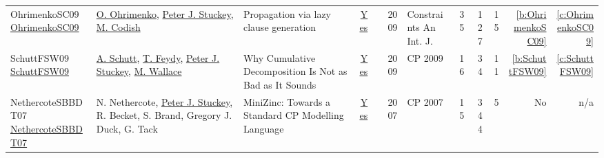 {\begin{longtable}{>{\raggedright\arraybackslash}p{3cm}>{\raggedright\arraybackslash}p{6cm}>{\raggedright\arraybackslash}p{6.5cm}rrrp{2.5cm}rrrrr}
OhrimenkoSC09 \href{http://dx.doi.org/10.1007/s10601-008-9064-x}{OhrimenkoSC09} & \hyperref[auth:a874]{O. Ohrimenko}, \hyperref[auth:a126]{Peter J. Stuckey}, \hyperref[auth:a875]{M. Codish} & Propagation via lazy clause generation & \href{works/OhrimenkoSC09.pdf}{Yes} & \cite{OhrimenkoSC09} & 2009 & Constraints An Int. J. & 35 & 127 & 15 & \ref{b:OhrimenkoSC09} & \ref{c:OhrimenkoSC09}\\
SchuttFSW09 \href{https://doi.org/10.1007/978-3-642-04244-7\_58}{SchuttFSW09} & \hyperref[auth:a125]{A. Schutt}, \hyperref[auth:a155]{T. Feydy}, \hyperref[auth:a126]{Peter J. Stuckey}, \hyperref[auth:a117]{M. Wallace} & Why Cumulative Decomposition Is Not as Bad as It Sounds & \href{works/SchuttFSW09.pdf}{Yes} & \cite{SchuttFSW09} & 2009 & CP 2009 & 16 & 34 & 11 & \ref{b:SchuttFSW09} & \ref{c:SchuttFSW09}\\
NethercoteSBBDT07 \href{https://doi.org/10.1007/978-3-540-74970-7\_38}{NethercoteSBBDT07} & N. Nethercote, \hyperref[auth:a126]{Peter J. Stuckey}, R. Becket, S. Brand, Gregory J. Duck, G. Tack & MiniZinc: Towards a Standard {CP} Modelling Language & \href{works/NethercoteSBBDT07.pdf}{Yes} & \cite{NethercoteSBBDT07} & 2007 & CP 2007 & 15 & 344 & 5 & No & n/a\\
\end{longtable}
}

